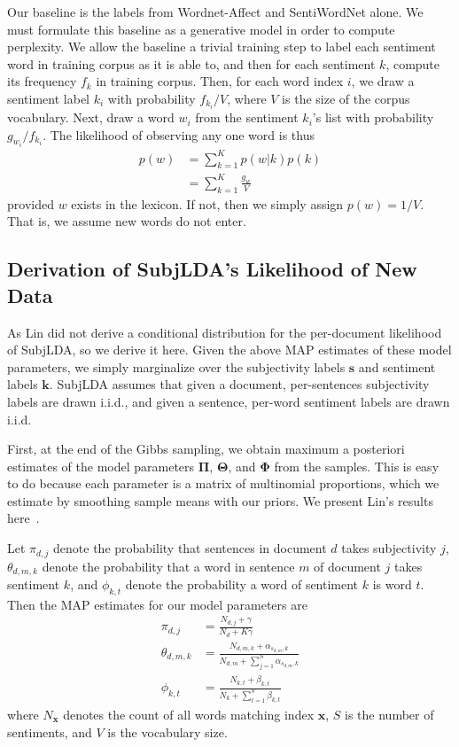 \documentclass{article}
\begin{document}
Our baseline is the labels from Wordnet-Affect and SentiWordNet
alone.  We must formulate this baseline as a generative model in
order to compute perplexity. We allow the baseline a trivial training
step to label each sentiment word in training corpus as it is able
to, and then for each sentiment $k$, compute its frequency $f_k$
in training corpus.  Then, for each word index $i$, we draw a
sentiment label $k_i$ with probability $f_{k_i} / V$, where $V$ is
the size of the corpus vocabulary. Next, draw a word $w_i$ from the
sentiment $k_i$'s list with probability $g_{w_i} / f_{k_i}$. The
likelihood of observing any one word is thus
\begin{equation} \label{eqn:base-likelihood}
\begin{aligned}
p(w) &= \sum_{k=1}^K p(w|k) p(k) \\
     &= \sum_{k=1}^K \frac{g_w}{V}
\end{aligned}
\end{equation}
provided $w$ exists in the lexicon. If not, then we simply assign
$p(w) = 1/V$. That is, we assume new words do not enter.

\subsection{Derivation of SubjLDA's Likelihood of New Data}
As Lin did not derive a conditional distribution for the per-document
likelihood of SubjLDA, so we derive it here. Given the above MAP
estimates of these model parameters, we simply marginalize over the
subjectivity labels $\mathbf{s}$ and sentiment labels $\mathbf{k}$.
SubjLDA assumes that given a document, per-sentences subjectivity
labels are drawn i.i.d., and given a sentence, per-word sentiment
labels are drawn i.i.d.

First, at the end of the Gibbs sampling, we obtain maximum a
posteriori estimates of the model parameters $\mathbf{\Pi}$,
$\mathbf{\Theta}$, and $\mathbf{\Phi}$ from the samples. This is
easy to do because each parameter is a matrix of multinomial
proportions, which we estimate by smoothing sample means with our
priors. We present Lin's results here~\citep{lin03}.

Let $\pi_{d,j}$ denote the probability that sentences in document
$d$ takes subjectivity $j$, $\theta_{d,m,k}$ denote the probability
that a word in sentence $m$ of document $j$ takes sentiment $k$,
and $\phi_{k,t}$ denote the probability a word of sentiment $k$ is
word $t$. Then the MAP estimates for our model parameters are
\begin{align}
\pi_{d,j}      &= \frac{N_{d,j} + \gamma}{N_d + K\gamma} \\
\theta_{d,m,k} &= \frac{N_{d,m,k} + \alpha_{s_{d,m},k}}{N_{d,m} + \sum_{j=1}^S \alpha_{s_{d,m},k}} \\
\phi_{k,t}     &= \frac{N_{k,t} + \beta_{k,t}}{N_k + \sum_{t=1}^V \beta_{k,t}}
\end{align}
where $N_{\mathbf{x}}$ denotes the count of all words matching
index $\mathbf{x}$, $S$ is the number of sentiments, and $V$ is the
vocabulary size.
\end{document}
